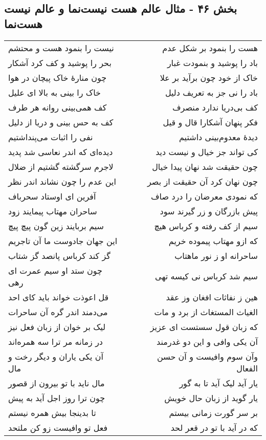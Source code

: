 \begin{center}
\section*{بخش ۴۶ - مثال عالم هست نیست‌نما و عالم نیست هست‌نما}
\label{sec:sh046}
\begin{longtable}{l p{0.5cm} r}
نیست را بنمود هست و محتشم
&&
هست را بنمود بر شکل عدم
\\
بحر را پوشید و کف کرد آشکار
&&
باد را پوشید و بنمودت غبار
\\
چون منارهٔ خاک پیچان در هوا
&&
خاک از خود چون برآید بر علا
\\
خاک را بینی به بالا ای علیل
&&
باد را نی جز به تعریف دلیل
\\
کف همی‌بینی روانه هر طرف
&&
کف بی‌دریا ندارد منصرف
\\
کف به حس بینی و دریا از دلیل
&&
فکر پنهان آشکارا قال و قیل
\\
نفی را اثبات می‌پنداشتیم
&&
دیدهٔ معدوم‌بینی داشتیم
\\
دیده‌ای که اندر نعاسی شد پدید
&&
کی تواند جز خیال و نیست دید
\\
لاجرم سرگشته گشتیم از ضلال
&&
چون حقیقت شد نهان پیدا خیال
\\
این عدم را چون نشاند اندر نظر
&&
چون نهان کرد آن حقیقت از بصر
\\
آفرین ای اوستاد سحرباف
&&
که نمودی معرضان را درد صاف
\\
ساحران مهتاب پیمایند زود
&&
پیش بازرگان و زر گیرند سود
\\
سیم بربایند زین گون پیچ پیچ
&&
سیم از کف رفته و کرباس هیچ
\\
این جهان جادوست ما آن تاجریم
&&
که ازو مهتاب پیموده خریم
\\
گز کند کرباس پانصد گز شتاب
&&
ساحرانه او ز نور ماهتاب
\\
چون ستد او سیم عمرت ای رهی
&&
سیم شد کرباس نی کیسه تهی
\\
قل اعوذت خواند باید کای احد
&&
هین ز نفاثات افغان وز عقد
\\
می‌دمند اندر گره آن ساحرات
&&
الغیاث المستغاث از برد و مات
\\
لیک بر خوان از زبان فعل نیز
&&
که زبان قول سستست ای عزیز
\\
در زمانه مر ترا سه همره‌اند
&&
آن یکی وافی و این دو غدرمند
\\
آن یکی یاران و دیگر رخت و مال
&&
وآن سوم وافیست و آن حسن الفعال
\\
مال ناید با تو بیرون از قصور
&&
یار آید لیک آید تا به گور
\\
چون ترا روز اجل آید به پیش
&&
یار گوید از زبان حال خویش
\\
تا بدینجا بیش همره نیستم
&&
بر سر گورت زمانی بیستم
\\
فعل تو وافیست زو کن ملتحد
&&
که در آید با تو در قعر لحد
\\
\end{longtable}
\end{center}
